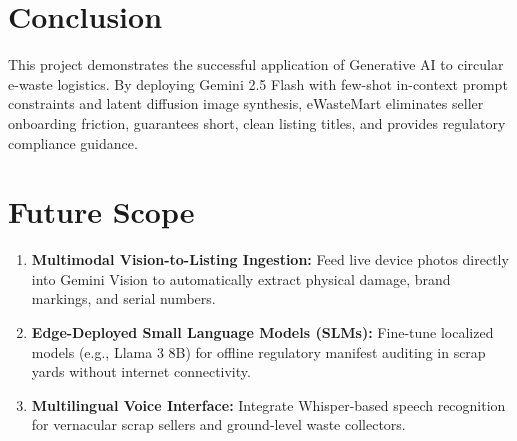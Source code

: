 \documentclass[12pt,a4paper]{article}
\begin{document}
\section{Conclusion}
This project demonstrates the successful application of Generative AI to circular e-waste logistics. By deploying Gemini 2.5 Flash with few-shot in-context prompt constraints and latent diffusion image synthesis, eWasteMart eliminates seller onboarding friction, guarantees short, clean listing titles, and provides regulatory compliance guidance.

\section{Future Scope}
\begin{enumerate}
    \item \textbf{Multimodal Vision-to-Listing Ingestion:} Feed live device photos directly into Gemini Vision to automatically extract physical damage, brand markings, and serial numbers.
    \item \textbf{Edge-Deployed Small Language Models (SLMs):} Fine-tune localized models (e.g., Llama 3 8B) for offline regulatory manifest auditing in scrap yards without internet connectivity.
    \item \textbf{Multilingual Voice Interface:} Integrate Whisper-based speech recognition for vernacular scrap sellers and ground-level waste collectors.
\end{enumerate}

\end{document}
